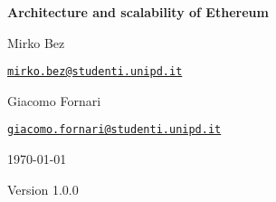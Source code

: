 \begin{titlepage}
  \centering
  \vspace*{4cm}
  {\huge\bfseries Architecture and scalability of Ethereum\par}
  \vspace{1.5cm}
  \begin{minipage}{.45\textwidth}
    \centering
    {\Large Mirko Bez\par}
    \vspace{0.15cm}
    {\texttt{\href{mailto:mirko.bez@studenti.unipd.it}{mirko.bez@studenti.unipd.it}}}
  \end{minipage}
  \hfill
  \begin{minipage}{.45\textwidth}
    \centering
    {\Large Giacomo Fornari\par}
    \vspace{0.15cm}
    {\texttt{\href{mailto:giacomo.fornari@studenti.unipd.it}{giacomo.fornari@studenti.unipd.it}}}
  \end{minipage}
  \par
  \vspace{1cm}
  {\large \today}

  \vfill

  {\large Version 1.0.0}
\end{titlepage}